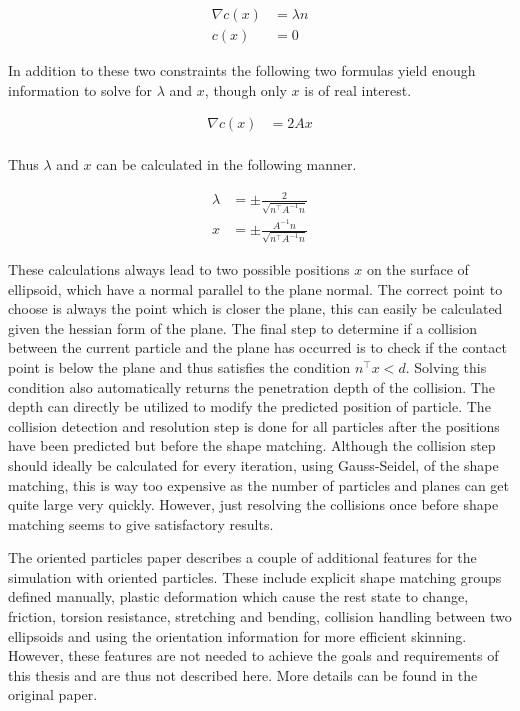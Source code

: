 \begin{align}
\nabla c(x)&=\lambda n \\
c(x) &= 0
\end{align}

In addition to these two constraints the following two formulas yield enough information to solve for $\lambda$ and $x$, though only $x$ is of real interest.

\begin{align}
\nabla c(x)&=2 A x \\
\end{align}

Thus $\lambda$ and $x$ can be calculated in the following manner.

\begin{align}
\lambda &= \pm \frac{2}{\sqrt{n^\top A^{-1} n}} \\
x &= \pm \frac{A^{-1}n}{\sqrt{n^\top A^{-1} n}}
\end{align}

These calculations always lead to two possible positions $x$ on the surface of ellipsoid, which have a normal parallel to the plane normal. The correct point to choose is always the point which is closer the plane, this can easily be calculated given the hessian form of the plane. The final step to determine if a collision between the current particle and the plane has occurred is to check if the contact point is below the plane and thus satisfies the condition $n^\top x < d$. Solving this condition also automatically returns the penetration depth of the collision. The depth can directly be utilized to modify the predicted position of particle. The collision detection and resolution step is done for all particles after the positions have been predicted but before the shape matching. Although the collision step should ideally be calculated for every iteration, using Gauss-Seidel, of the shape matching, this is way too expensive as the number of particles and planes can get quite large very quickly. However, just resolving the collisions once before shape matching seems to give satisfactory results.

The oriented particles paper describes a couple of additional features for the simulation with oriented particles. These include explicit shape matching groups defined manually, plastic deformation which cause the rest state to change, friction, torsion resistance, stretching and bending, collision handling between two ellipsoids and using the orientation information for more efficient skinning. However, these features are not needed to achieve the goals and requirements of this thesis and are thus not described here. More details can be found in the original paper.